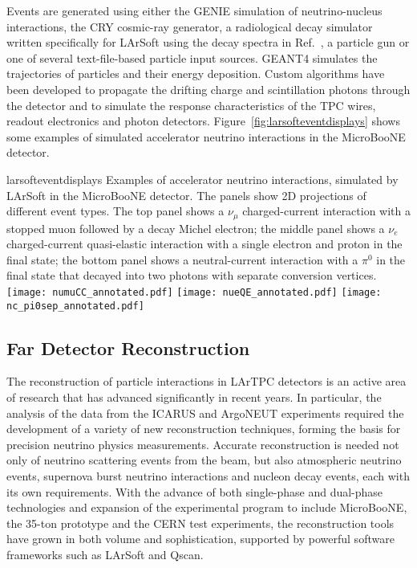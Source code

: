 Events are generated using either the GENIE\cite{GENIE} simulation of
neutrino-nucleus interactions, the
CRY\cite{Cosmic-CRY,Cosmic-CRY-protons,CRY-url} cosmic-ray generator,
a radiological decay simulator written specifically for LArSoft using
the decay spectra in Ref.~\cite{docdb-8797}, a particle gun or one of
several text-file-based particle input sources. GEANT4 
simulates the trajectories of particles and their energy
deposition.  Custom algorithms have been developed to propagate the
drifting charge and scintillation photons through the detector and to
simulate the response characteristics of the TPC wires, readout
electronics and photon detectors.
Figure~\ref{fig:larsofteventdisplays} shows some examples of simulated
accelerator neutrino interactions in the MicroBooNE detector.
\begin{cdrfigure}{larsofteventdisplays}
{Examples of accelerator neutrino interactions, simulated by LArSoft
  in the MicroBooNE detector. The panels show 2D projections of
  different event types.  The top panel shows a $\nu_{\mu}$
  charged-current interaction with a stopped muon followed by a decay
  Michel electron; the middle panel shows a $\nu_{e}$ charged-current
  quasi-elastic interaction with a single electron and proton in the
  final state; the bottom panel shows a neutral-current interaction
  with a $\pi^{0}$ in the final state that decayed into two photons
  with separate conversion vertices.}
\texttt{[image: numuCC\_annotated.pdf]}
\texttt{[image: nueQE\_annotated.pdf]}
\texttt{[image: nc\_pi0sep\_annotated.pdf]}
\end{cdrfigure}

\subsection{Far Detector Reconstruction}
\label{sec:detectors-sc-physics-software-reconstruction-fd}

The reconstruction of particle interactions in LArTPC detectors is an
active area of research that has advanced significantly in recent
years.  In particular, the analysis of the data from the
ICARUS\cite{Amerio:2004ze,icarus-url,ICARUS-pizero,Antonello:2012hu}
and ArgoNEUT
experiments\cite{Adamson:2013/02/28tla,argoneut-url,Acciarri:2013met}
required the development of a variety of new reconstruction
techniques, forming the basis for precision neutrino physics
measurements.  Accurate reconstruction is needed not only of neutrino
scattering events from the beam, but also atmospheric neutrino events,
supernova burst neutrino interactions and nucleon decay events, each
with its own requirements.  With the advance of both single-phase and
dual-phase technologies and expansion of the experimental program to
include MicroBooNE\cite{Chen:2007ae,microboone-url}, the 35-ton
prototype and the CERN test experiments, the reconstruction tools have
grown in both volume and sophistication, supported by powerful
software frameworks such as LArSoft and Qscan.

